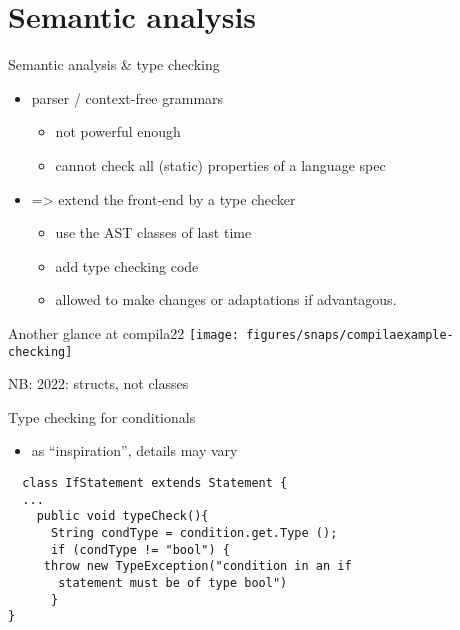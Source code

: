 \documentclass{beamer}
\begin{document}
\chapter{Semantic analysis}
\label{sec:org0db736d}
\begin{frame}[label={sec:orgd317740}]{Semantic analysis \& type checking}
\begin{itemize}
\item parser / context-free  grammars 
\begin{itemize}
\item not powerful enough
\item cannot check all (static) properties of a language spec
\end{itemize}

\item => extend the front-end by a type checker

\begin{itemize}
\item use the AST classes of last time
\item add type checking code
\item allowed to make \alert{changes} or adaptations if advantagous.
\end{itemize}
\end{itemize}
\end{frame}


\begin{frame}[label={sec:orgac88ad2}]{Another glance at compila22}
\texttt{[image: figures/snaps/compilaexample-checking]}


NB: 2022: structs, not classes 
\end{frame}


\begin{frame}[label={sec:org0fc0cf7},fragile,plain]{Type checking for conditionals}
 \begin{itemize}
\item as ``inspiration'', details may vary
\end{itemize}


\lstset{language=java,label= ,caption= ,captionpos=b,numbers=none}
\begin{lstlisting}
  class IfStatement extends Statement {
  ...
    public void typeCheck(){
      String condType = condition.get.Type ();
      if (condType != "bool") {  
	 throw new TypeException("condition in an if 
	   statement must be of type bool")
      }
}
\end{lstlisting}
\end{frame}
\end{document}
